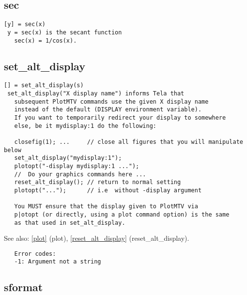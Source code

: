 \documentclass[a4paper]{article}
\begin{document}
\subsection{sec\label{sec}}

\begin{tscreen}
\begin{verbatim}
[y] = sec(x)
 y = sec(x) is the secant function
   sec(x) = 1/cos(x). 
\end{verbatim}
\end{tscreen}





\subsection{set\_alt\_display\label{set_alt_display}}

\begin{tscreen}
\begin{verbatim}
[] = set_alt_display(s)
 set_alt_display("X display name") informs Tela that
   subsequent PlotMTV commands use the given X display name
   instead of the default (DISPLAY environment variable).
   If you want to temporarily redirect your display to somewhere
   else, be it mydisplay:1 do the following:

   closefig(1); ...     // close all figures that you will manipulate below
   set_alt_display("mydisplay:1");
   plotopt("-display mydisplay:1 ...");
   //  Do your graphics commands here ...
   reset_alt_display(); // return to normal setting
   plotopt("...");      // i.e  without -display argument

   You MUST ensure that the display given to PlotMTV via
   p|otopt (or directly, using a plot command option) is the same
   as that used in set_alt_display.
\end{verbatim}

See also: \ref{plot} {(plot)}, \ref{reset_alt_display} {(reset\_alt\_display)}.
\begin{verbatim}
   Error codes:
   -1: Argument not a string
\end{verbatim}
\end{tscreen}





\subsection{sformat\label{sformat}}
\end{document}
